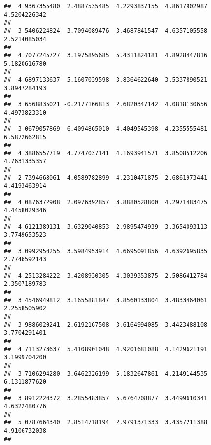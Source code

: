 \documentclass[]{article}
\begin{document}
\begin{verbatim}
##  4.9367355480  2.4887535485  4.2293837155  4.8617902987  4.5204226342 
##                                                                       
##  3.5406224824  3.7094089476  3.4687841547  4.6357105558  2.5214085034 
##                                                                       
##  4.7077245727  3.1975895685  5.4311824181  4.8928447816  5.1820616780 
##                                                                       
##  4.6897133637  5.1607039598  3.8364622640  3.5337890521  3.8947284193 
##                                                                       
##  3.6568835021 -0.2177166813  2.6820347142  4.0818130656  4.4973823310 
##                                                                       
##  3.0679057869  6.4094865010  4.4049545398  4.2355555481  6.5872662815 
##                                                                       
##  4.3886557719  4.7747037141  4.1693941571  3.8508512206  4.7631335357 
##                                                                       
##  2.7394668061  4.0589782899  4.2310471875  2.6861973441  4.4193463914 
##                                                                       
##  4.0876372908  2.0976392857  3.8880528800  4.2971483475  4.4458029346 
##                                                                       
##  4.6121389131  3.6329040853  2.9895474939  3.3654093113  3.7749653523 
##                                                                       
##  3.0992950255  3.5984953914  4.6695091856  4.6392695835  2.7746592143 
##                                                                       
##  4.2513284222  3.4208930305  4.3039353875  2.5086412784  2.3507189783 
##                                                                       
##  3.4546949812  3.1655881847  3.8560133804  3.4833464061  2.2558505902 
##                                                                       
##  3.9886020241  2.6192167508  3.6164994085  3.4423488108  3.7704291401 
##                                                                       
##  4.7113273637  5.4108901048  4.9201681088  4.1429621191  3.1999704200 
##                                                                       
##  3.7106294280  3.6462326199  5.1832647861  4.2149144535  6.1311877620 
##                                                                       
##  3.8912220372  3.2855483857  5.6764708877  3.4499610341  4.6322480776 
##                                                                       
##  5.0787664340  2.8514718194  2.9791371333  3.4357211388  4.9106732038 
##                                                                       

\end{verbatim}
\end{document}
